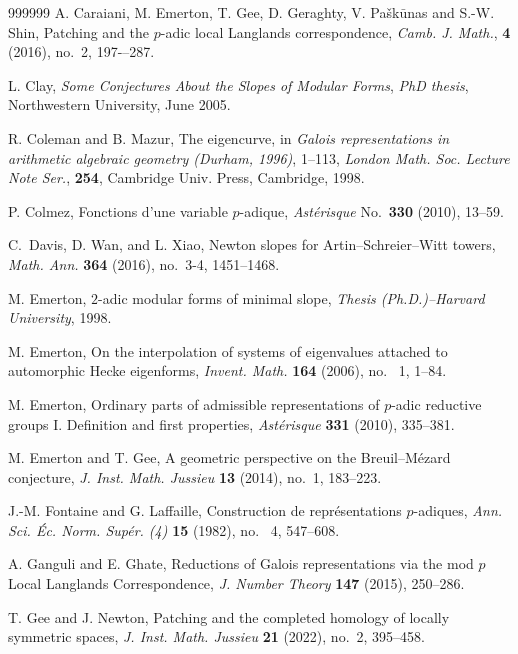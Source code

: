 \documentclass[12pt]{amsart}
\theoremstyle{definition}
\numberwithin{equation}{subsection}
\begin{document}
\begin{thebibliography}{999999}
A. Caraiani, M. Emerton, T. Gee, D. Geraghty, V. Pa\v sk$\bar{\mathrm{u}}$nas and S.-W. Shin, Patching and the $p$-adic local Langlands correspondence, {\it Camb. J.  Math.}, {\bf 4} (2016), no.~2, 197-–287.


L. Clay, {\it Some Conjectures About the Slopes of Modular Forms}, {\it
PhD thesis}, Northwestern University, June 2005.


R. Coleman and B. Mazur,
The eigencurve, in {\it Galois representations in arithmetic algebraic geometry (Durham, 1996)}, 1--113,
{\it London Math. Soc. Lecture Note Ser.}, {\bf 254}, Cambridge Univ. Press, Cambridge, 1998.

P. Colmez,
Fonctions d'une variable $p$-adique, {\it Ast\'erisque} No.~{\bf 330} (2010), 13--59.

C.~Davis, D. Wan, and L. Xiao, Newton slopes for Artin--Schreier--Witt towers, {\it Math. Ann.} {\bf 364} (2016), no.~3-4, 1451--1468.




M. Emerton,
$2$-adic modular forms of minimal slope, {\it Thesis (Ph.D.)--Harvard University}, 1998.

M. Emerton,
On the interpolation of systems of eigenvalues attached to automorphic Hecke eigenforms, {\it Invent. Math.} {\bf 164} (2006), no. ~1, 1--84.


M. Emerton, Ordinary parts of admissible representations of $p$-adic reductive groups I. Definition and first properties, {\it Ast\'erisque} {\bf 331} (2010), 335--381.


M. Emerton and T. Gee,
A geometric perspective on the Breuil--M\'ezard conjecture, {\it	J. Inst. Math. Jussieu} {\bf13} (2014), no.~1, 183--223. 



J.-M. Fontaine and G. Laffaille, Construction de repr\'esentations $p$-adiques, {\it Ann. Sci. \'Ec. Norm. Sup\'er. (4)} {\bf 15} (1982), no. ~4, 547--608.

A. Ganguli and E. Ghate,
Reductions of Galois representations via the mod $p$ Local Langlands Correspondence, {\it J. Number Theory} {\bf 147} (2015), 250--286.

T. Gee and J. Newton, Patching and the completed homology of locally symmetric spaces, {\it J. Inst. Math. Jussieu} {\bf 21} (2022), no.~2, 395--458.


\end{thebibliography}
\end{document}
